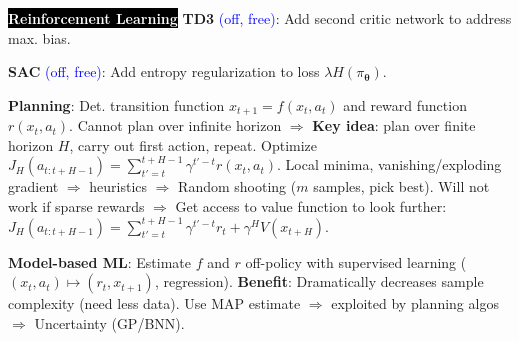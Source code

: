 \documentclass{article}
\newcommand{\blue}[1]{\textcolor{blue}{#1}}
\newenvironment{topic}[1]
{\textbf{\sffamily  \colorbox{black}{\textcolor{white}{#1}}}}
{}
\begin{document}
\begin{multicols*}{3}
\begin{topic}{Reinforcement Learning}
    \textbf{TD3} \blue{(off, free)}: Add second critic network to address max.
    bias.

    \textbf{SAC} \blue{(off, free)}: Add entropy regularization to loss
    $\lambda H(\pi_{\bm{\theta}})$.

    \textbf{Planning}: Det. transition function $x_{t+1} = f(x_t,a_t)$ and
    reward function $r(x_t,a_t)$. Cannot plan over infinite horizon
    $\Rightarrow$ \textbf{Key idea}: plan over finite horizon $H$, carry
    out first action, repeat. Optimize $J_H(a_{t:t+H-1}) = \sum_{t'=t}^{t+H-1}
    \gamma^{t'-t} r(x_t,a_t)$. Local minima, vanishing/exploding gradient
    $\Rightarrow$ heuristics $\Rightarrow$ Random shooting ($m$ samples, pick
    best). Will not work if sparse rewards $\Rightarrow$ Get access to value
    function to look further: $J_H(a_{t:t+H-1}) = \sum_{t'=t}^{t+H-1}
    \gamma^{t'-t}r_t + \gamma^HV(x_{t+H})$.

    \textbf{Model-based ML}: Estimate $f$ and $r$ off-policy with supervised
    learning ($(x_t,a_t) \mapsto (r_t,x_{t+1})$, regression). \textbf{Benefit}:
    Dramatically decreases sample complexity (need less data). Use MAP estimate
    $\Rightarrow$ exploited by planning algos $\Rightarrow$ Uncertainty
    (GP/BNN).

  \end{topic}

\end{multicols*}
\end{document}
